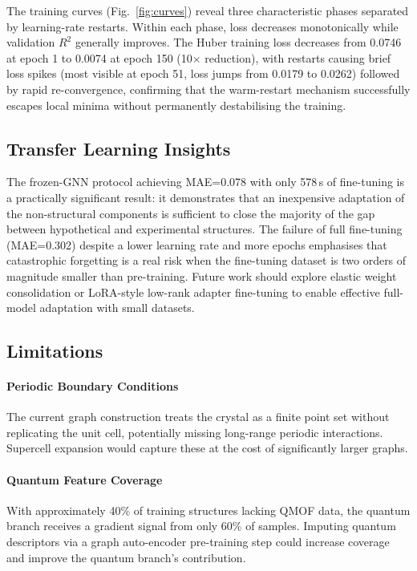 \documentclass[conference]{IEEEtran}
\begin{document}
The training curves (Fig.~\ref{fig:curves}) reveal three characteristic
phases separated by learning-rate restarts.  Within each phase, loss
decreases monotonically while validation $R^2$ generally improves.
The Huber training loss decreases from 0.0746 at epoch 1 to 0.0074 at
epoch 150 (10$\times$ reduction), with restarts causing brief loss spikes
(most visible at epoch 51, loss jumps from 0.0179 to 0.0262) followed by
rapid re-convergence, confirming that the warm-restart mechanism
successfully escapes local minima without permanently destabilising the
training.

\subsection{Transfer Learning Insights}

The frozen-GNN protocol achieving MAE=0.078 with only 578\,s of fine-tuning
is a practically significant result: it demonstrates that an inexpensive
adaptation of the non-structural components is sufficient to close the
majority of the gap between hypothetical and experimental structures.
The failure of full fine-tuning (MAE=0.302) despite a lower learning rate
and more epochs emphasises that catastrophic forgetting is a real risk when
the fine-tuning dataset is two orders of magnitude smaller than pre-training.
Future work should explore elastic weight consolidation or LoRA-style
low-rank adapter fine-tuning \cite{mace2022} to enable effective full-model
adaptation with small datasets.

\subsection{Limitations}

\paragraph{Periodic Boundary Conditions}
The current graph construction treats the crystal as a finite point set
without replicating the unit cell, potentially missing long-range periodic
interactions.  Supercell expansion would capture these at the cost of
significantly larger graphs.

\paragraph{Quantum Feature Coverage}
With approximately 40\% of training structures lacking QMOF data, the
quantum branch receives a gradient signal from only 60\% of samples.
Imputing quantum descriptors via a graph auto-encoder pre-training step
could increase coverage and improve the quantum branch's contribution.
\end{document}
